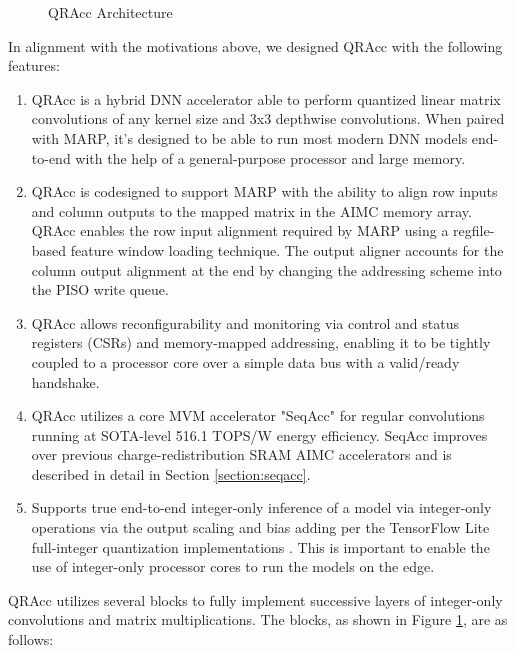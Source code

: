 \begin{figure}[h]
    \centering
    
    \caption{QRAcc Architecture}
    \label{fig:qracc_architecture}
\end{figure}

In alignment with the motivations above, we designed QRAcc with the following features:

\begin{enumerate}
    \item QRAcc is a hybrid DNN accelerator able to perform quantized linear matrix convolutions of any kernel size and 3x3 depthwise convolutions. When paired with MARP, it's designed to be able to run most modern DNN models end-to-end with the help of a general-purpose processor and large memory.
    \item QRAcc is codesigned to support MARP with the ability to align row inputs and column outputs to the mapped matrix in the AIMC memory array. QRAcc enables the row input alignment required by MARP using a regfile-based feature window loading technique. The output aligner accounts for the column output alignment at the end by changing the addressing scheme into the PISO write queue. 
    \item QRAcc allows reconfigurability and monitoring via control and status registers (CSRs) and memory-mapped addressing, enabling it to be tightly coupled to a processor core over a simple data bus with a valid/ready handshake.
    \item QRAcc utilizes a core MVM accelerator "SeqAcc" for regular convolutions running at SOTA-level 516.1 TOPS/W energy efficiency. SeqAcc improves over previous charge-redistribution SRAM AIMC accelerators \cite{jiang2020c3sram} and is described in detail in Section \ref{section:seqacc}.
    \item Supports true end-to-end integer-only inference of a model via integer-only operations via the output scaling and bias adding per the TensorFlow Lite full-integer quantization implementations \cite{jacob2018quantization}. This is important to enable the use of integer-only processor cores to run the models on the edge.
\end{enumerate}

QRAcc utilizes several blocks to fully implement successive layers of integer-only convolutions and matrix multiplications. The blocks, as shown in Figure \ref{fig:qracc_architecture}, are as follows:

